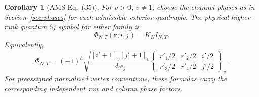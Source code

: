 \documentclass[10pt,a4paper]{article}
\newtheorem{corollary}[theorem]{Corollary}
\newcommand{\brac}[2]{\begin{Bmatrix}#1\\#2\end{Bmatrix}}
\begin{document}
\begin{corollary}[AMS Eq.~(35)]\label{cor:AMS}
For $v>0$, $v\ne1$, choose the channel phases as in
Section~\ref{sec:phases} for each admissible exterior quadruple. The physical higher-rank
quantum $6j$ symbol for either family is
\begin{equation}\label{eq:AMSproved}
 \boxed{\displaystyle\Phi_{N,T}(\boldsymbol r;i,j)=K_N I_{N,T}.}
\end{equation}
Equivalently,
\begin{equation}\label{eq:rank6j}
 \Phi_{N,T}=(-1)^h\sqrt{\frac{[i'+1]_v[j'+1]_v}{d_i e_j}}
 \brac{r'_1/2&r'_2/2&i'/2}{r'_3/2&r'_4/2&j'/2}_{v}.
\end{equation}
For preassigned normalized vertex conventions, these formulas carry
the corresponding independent row and column phase factors.
\end{corollary}
\end{document}
